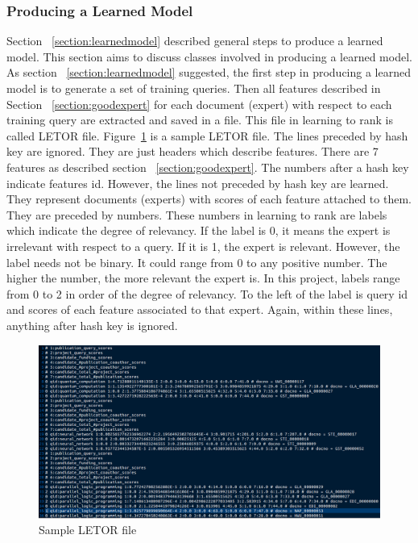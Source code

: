 \subsubsection{Producing a Learned Model}\label{section:producelearnedmodel}
Section ~\ref{section:learnedmodel} described general steps to produce a learned model. This section aims to discuss classes involved in producing a learned model.
As section ~\ref{section:learnedmodel} suggested, the first step in producing a learned model is to generate a set of training queries. 
Then all features described in Section ~\ref{section:goodexpert} for each document (expert) with respect to each training query are extracted and saved
in a file. This file in learning to rank is called LETOR file. Figure~\ref{fig:sampleletorfile} is a sample LETOR file. The lines preceded by hash key are 
ignored. They are just headers which describe features. There are 7 features as described section ~\ref{section:goodexpert}.
The numbers after a hash key indicate features id. However, the lines not preceded by hash key are learned. They represent documents (experts) with scores
of each feature attached to them. They are preceded by numbers. These numbers in learning to rank are labels which indicate the degree of relevancy.
If the label is 0, it means the expert is irrelevant with respect to a query. If it is 1, the expert is relevant. However, the label needs not be binary.
It could range from 0 to any positive number. The higher the number, the more relevant the expert is. In this project, labels range from 0 to 2 in order of 
the degree of relevancy. To the left of the label is query id and scores of each feature associated to that expert. Again, within these lines, anything after hash key is ignored.
\begin{figure}
\centering
\includegraphics[scale=0.3]{./figures/sampleletorfile.png}
\caption{Sample LETOR file} \label{fig:sampleletorfile} 
\end{figure}

